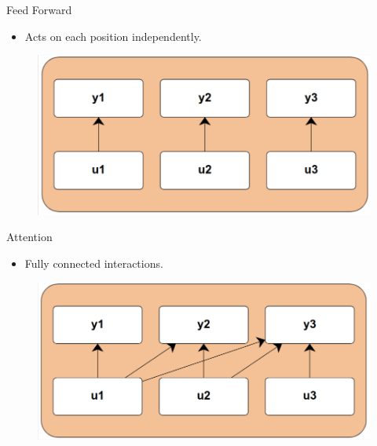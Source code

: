 \begin{frame}{Feed Forward}
    \begin{itemize}
        \item Acts on each position independently. 
    \end{itemize}
    \begin{figure}
        \centering
        \includegraphics[height=0.5\textheight, clip,trim={0.1cm 0.1cm 0.1cm 0.1cm}]{Figs/out4.png}
    \end{figure}
\end{frame}

\begin{frame}[c]{Attention} 
    \begin{itemize}
        \item Fully connected interactions.
    \end{itemize}

    \centering
    \begin{figure}
        \centering
        \includegraphics[height=0.5\textheight,  clip,trim={0.1cm 0.1cm 0.1cm 0.1cm}]{Figs/out5.png}
        \label{fig:my_label}
    \end{figure}    
\end{frame}



